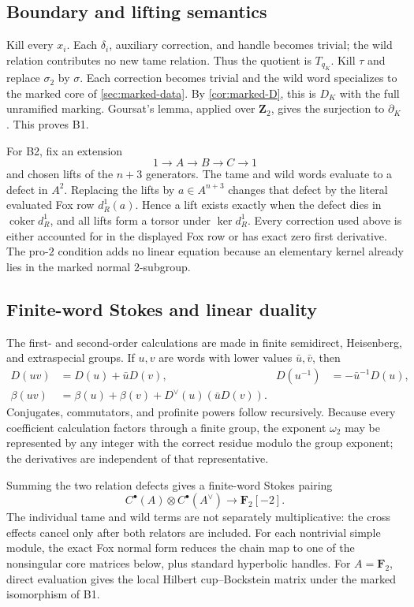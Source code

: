 \documentclass[11pt,reqno]{amsart}
\theoremstyle{definition}
\theoremstyle{remark}
\numberwithin{equation}{section}
\newcommand{\Z}{\mathbf Z}
\newcommand{\F}{\mathbf F}
\newcommand{\coker}{\operatorname{coker}}
\begin{document}
\subsection{Boundary and lifting semantics}

Kill every \(x_i\).  Each \(\delta_i\), auxiliary correction, and handle
becomes trivial; the wild relation contributes no new tame relation.
Thus the quotient is \(T_{q_K}\).  Kill \(\tau\) and replace
\(\sigma_2\) by \(\sigma\).  Each correction becomes trivial and the
wild word specializes to the marked core of
\cref{sec:marked-data}.  By \cref{cor:marked-D}, this is \(D_K\) with
the full unramified marking.  Goursat's lemma, applied over \(\Z_2\),
gives the surjection to \(\partial_K\).  This proves B1.

For B2, fix an extension
\[
 1\longrightarrow A\longrightarrow B\longrightarrow C\longrightarrow1
\]
and chosen lifts of the \(n+3\) generators.  The tame and wild words
evaluate to a defect in \(A^2\).  Replacing the lifts by
\(a\in A^{n+3}\) changes that defect by the literal evaluated Fox row
\(d_R^1(a)\).  Hence a lift exists exactly when the defect dies in
\(\coker d_R^1\), and all lifts form a torsor under \(\ker d_R^1\).
Every correction used above is either accounted for in the displayed
Fox row or has exact zero first derivative.  The pro-\(2\) condition
adds no linear equation because an elementary kernel already lies in
the marked normal \(2\)-subgroup.

\subsection{Finite-word Stokes and linear duality}

The first- and second-order calculations are made in finite semidirect,
Heisenberg, and extraspecial groups.  If \(u,v\) are words with lower
values \(\bar u,\bar v\), then
\begin{align}
 D(uv)&=D(u)+\bar uD(v),&
 D(u^{-1})&=-\bar u^{-1}D(u),\label{eq:fox-rules}\\
 \beta(uv)&=\beta(u)+\beta(v)
  +D^\vee(u)(\bar uD(v)).\label{eq:heis-rule}
\end{align}
Conjugates, commutators, and profinite powers follow recursively.
Because every coefficient calculation factors through a finite group,
the exponent \(\omega_2\) may be represented by any integer with the
correct residue modulo the group exponent; the derivatives are
independent of that representative.

Summing the two relation defects gives a finite-word Stokes pairing
\[
 C^\bullet(A)\otimes C^\bullet(A^\vee)
 \longrightarrow\F_2[-2].
\]
The individual tame and wild terms are not separately multiplicative:
the cross effects cancel only after both relators are included.  For
each nontrivial simple module, the exact Fox normal form reduces the
chain map to one of the nonsingular core matrices below, plus standard
hyperbolic handles.  For \(A=\F_2\), direct evaluation gives the local
Hilbert cup--Bockstein matrix under the marked isomorphism of B1.
\end{document}
